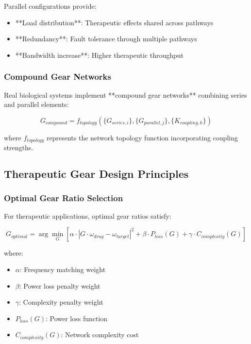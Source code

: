Parallel configurations provide:
\begin{itemize}
\item **Load distribution**: Therapeutic effects shared across pathways
\item **Redundancy**: Fault tolerance through multiple pathways
\item **Bandwidth increase**: Higher therapeutic throughput
\end{itemize}

\subsubsection{Compound Gear Networks}

Real biological systems implement **compound gear networks** combining series and parallel elements:

\begin{equation}
G_{compound} = f_{topology}(\{G_{series,i}\}, \{G_{parallel,j}\}, \{K_{coupling,k}\})
\end{equation}

where $f_{topology}$ represents the network topology function incorporating coupling strengths.

\subsection{Therapeutic Gear Design Principles}

\subsubsection{Optimal Gear Ratio Selection}

For therapeutic applications, optimal gear ratios satisfy:

\begin{equation}
G_{optimal} = \arg\min_{G} \left[\alpha \cdot |G \cdot \omega_{drug} - \omega_{target}|^2 + \beta \cdot P_{loss}(G) + \gamma \cdot C_{complexity}(G)\right]
\end{equation}

where:
\begin{itemize}
\item $\alpha$: Frequency matching weight
\item $\beta$: Power loss penalty weight  
\item $\gamma$: Complexity penalty weight
\item $P_{loss}(G)$: Power loss function
\item $C_{complexity}(G)$: Network complexity cost
\end{itemize}

